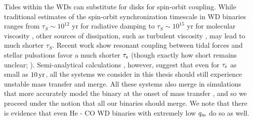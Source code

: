Tides within the WDs can substitute for disks for spin-orbit coupling.  While traditional estimates of the spin-orbit synchronization timescale in WD binaries ranges from $\tau_{S} \sim 10^{12}$ yr for radiative damping to $\tau_{S} \sim 10^{15}$ yr for molecular viscosity \citep{marsns04}, other sources of dissipation, such as turbulent viscosity \citep{mochl89}, may lead to much shorter $\tau_{S}$.  Recent work \citep{fulll12, burk+13, fulll14} show resonant coupling between tidal forces and stellar pulsations favor a much shorter $\tau_\mathrm{s}$ (though exactly how short remains unclear; \citealt{fulll14}).  Semi-analytical calculations \citep{marsns04,gokhpf07, kremsk15}, however, suggest that even for $\tau_\mathrm{s}$ as small as $10\,\mathrm{yr}$, all the systems we consider in this thesis should still experience unstable mass transfer and merge.  All these systems also merge in simulations that more accurately model the binary at the onset of mass transfer \citep{dan+11, dan+12}, and so we proceed under the notion that all our binaries should merge.  We note that there is evidence \citep{shen15, brow+16} that even He - CO WD binaries with extremely low $\qm$ do so as well.

